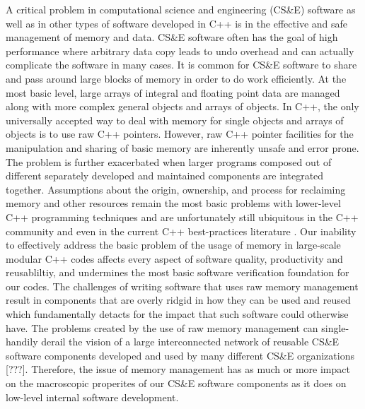\documentclass[pdf,ps2pdf,11pt]{SANDreport}
\begin{document}
A critical problem in computational science and engineering (CS\&E)
software as well as in other types of software developed in C++ is in
the effective and safe management of memory and data.  CS\&E software
often has the goal of high performance where arbitrary data copy leads
to undo overhead and can actually complicate the software in many
cases.  It is common for CS\&E software to share and pass around large
blocks of memory in order to do work efficiently.  At the most basic
level, large arrays of integral and floating point data are managed
along with more complex general objects and arrays of objects.  In
C++, the only universally accepted way to deal with memory for single
objects and arrays of objects is to use raw C++ pointers.  However,
raw C++ pointer facilities for the manipulation and sharing of basic
memory are inherently unsafe and error prone.  The problem is further
exacerbated when larger programs composed out of different separately
developed and maintained components are integrated together.
Assumptions about the origin, ownership, and process for reclaiming
memory and other resources remain the most basic problems with
lower-level C++ programming techniques and are unfortunately still
ubiquitous in the C++ community and even in the current C++
best-practices literature {}\cite{C++CodingStandards05,
EffectiveC++ThirdEdition}.  Our inability to effectively address the
basic problem of the usage of memory in large-scale modular C++ codes
affects every aspect of software quality, productivity and
reusabliltiy, and undermines the most basic software verification
foundation for our codes.  The challenges of writing software that
uses raw memory management result in components that are overly ridgid
in how they can be used and reused which fundamentally detacts for the
impact that such software could otherwise have.  The problems created
by the use of raw memory management can single-handily derail the
vision of a large interconnected network of reusable CS\&E software
components developed and used by many different CS\&E organizations
[???].  Therefore, the issue of memory management has as much or more
impact on the macroscopic properites of our CS\&E software components
as it does on low-level internal software development.
\end{document}
